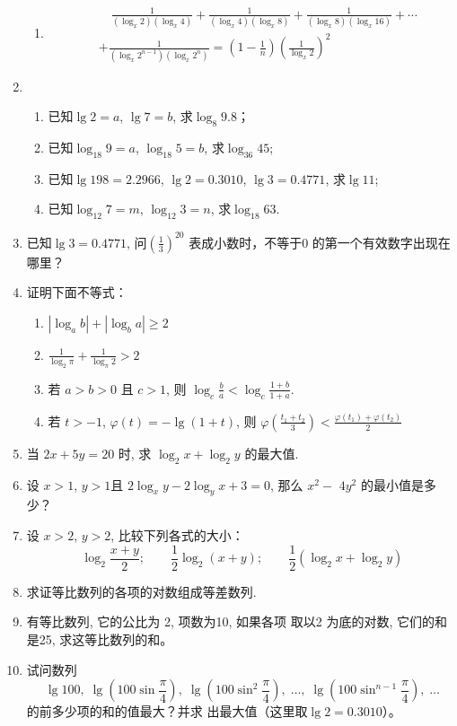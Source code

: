 \begin{enumerate}
\begin{enumerate}
  \item \[\begin{split}
    &\quad \frac{1}{(\log_x 2)(\log_x 4)}+   \frac{1}{(\log_x 4)(\log_x 8)}+   \frac{1}{(\log_x 8)(\log_x 16)}+\cdots \\
    &+   \frac{1}{(\log_x 2^{n-1})(\log_x 2^n)}=\left(1-\frac{1}{n}\right)\left(\frac{1}{\log_x 2}\right)^2
  \end{split}\]
\end{enumerate}

\item \begin{enumerate}
  \item 已知$\lg2=a$, $\lg7=b$, 求$\log_8 9.8$；
  \item 已知$\log_{18}9=a$, $\log_{18}5=b$, 求$\log_{36}45$;
  \item 已知$\lg198=2.2966$, $\lg2=0.3010$, $\lg3=0.4771$, 求$\lg 11$;
  \item 已知$\log_{12}7=m$, $\log_{12}3=n$, 求$\log_{18}63$.
\end{enumerate} 
\item 已知$\lg3=0.4771$, 问$\left(\frac{1}{3}\right)^{20}$
表成小数时，不等于0
的第一个有效数字出现在哪里？

\item  证明下面不等式：
\begin{enumerate}
  \item $\left|\log _{a} b\right|+\left|\log _{b} a\right| \geqslant 2$
  \item  $\frac{1}{\log _{2} \pi}+\frac{1}{\log _{\pi} 2}>2$
  \item 若 $a>b>0$ 且 $c>1$, 则 $\log _{c} \frac{b}{a}<\log _{c} \frac{1+b}{1+a}$.
  \item 若 $t>-1$, $\varphi(t)=-\lg(1+t)$, 则 $\varphi\left(\frac{t_{1}+t_{2}}{3}\right)<\frac{\varphi\left(t_{1}\right)+\varphi\left(t_{2}\right)}{2}$
\end{enumerate}


\item 当 $2 x+5 y=20$ 时, 求 $\log _{2} x+\log _{2} y$ 的最大值.
\item 设 $x>1$, $y>1$且 $2 \log _{x} y-2 \log _{y} x+3=0$, 那么 $x^{2}-$ $4 y^{2}$ 的最小值是多少？
\item  设 $x>2$, $y>2$, 比较下列各式的大小：
$$\log _{2} \frac{x+y}{2} ;\qquad \frac{1}{2} \log _{2}(x+y); \qquad \frac{1}{2}\left(\log _{2} x+\log _{2} y\right)$$
\item  求证等比数列的各项的对数组成等差数列.
\item  有等比数列, 它的公比为 2, 项数为10, 如果各项 取以2 为底的对数, 它们的和是25, 求这等比数列的和。

\item 试问数列
$$\lg100,\; \lg\left(100\sin\frac{\pi}{4}\right),\; \lg\left(100\sin^2\frac{\pi}{4}\right),\; \ldots ,\; \lg\left(100\sin^{n-1}\frac{\pi}{4}\right),\; \ldots$$
的前多少项的和的值最大？并求
出最大值（这里取$\lg2=0.3010$）。
\end{enumerate}

